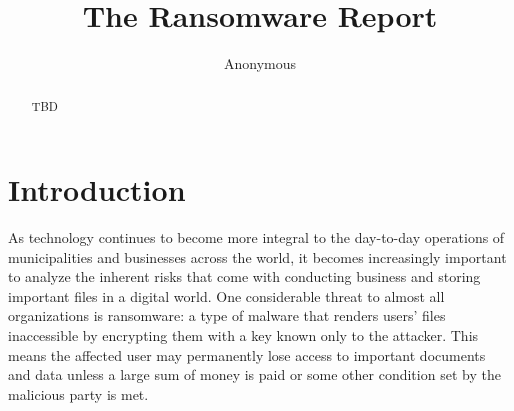 \documentclass[sigconf]{acmart}
\begin{document}
\title{The Ransomware Report}


\author{Anonymous}

\begin{abstract}
  TBD

\end{abstract}


\maketitle

\section{Introduction}
\label{introduction}
    As technology continues to become more integral to the day-to-day operations of municipalities and businesses across the world, it becomes increasingly important to analyze the inherent risks that come with conducting business and storing important files in a digital world. One considerable threat to almost all organizations is ransomware: a type of malware that renders users' files inaccessible by encrypting them with a key known only to the attacker. This means the affected user may permanently lose access to important documents and data unless a large sum of money is paid or some other condition set by the malicious party is met. 
    
\end{document}
